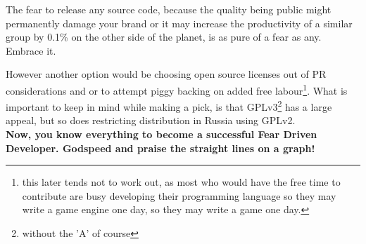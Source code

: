 \documentclass{book}
\begin{document}
    The fear to release any source code,
    because the quality being public might permanently damage your brand
    or it may increase the productivity of a similar group
    by 0.1\% on the other side of the planet,
    is as pure of a fear as any.
    Embrace it.

    However another option would be choosing open source licenses out of PR considerations
    and or to attempt piggy backing on added free labour\footnote{
        this later tends not to work out,
        as most who would have the free time to contribute
        are busy developing their programming language
        so they may write a game engine one day,
        so they may write a game one day.
    }.
    What is important to keep in mind while making a pick, is that GPLv3\footnote{
        without the 'A' of course
    }
    has a large appeal,
    but so does restricting distribution in Russia using GPLv2.
    \\

    \textbf{
        Now, you know everything to become a successful Fear Driven Developer.
        Godspeed and praise the straight lines on a graph!
    }
\end{document}
